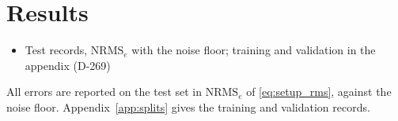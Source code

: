 \section{Results}\label{sec:results}
\ifdraft
\begin{itemize}
\item Test records, $\mathrm{NRMS}_e$ with the noise floor; training and validation in the appendix (D-269)
\end{itemize}
\fi
All errors are reported on the test set in $\mathrm{NRMS}_e$ of \eqref{eq:setup_rms},
against the noise floor.
Appendix~\ref{app:splits} gives the training and validation records.

